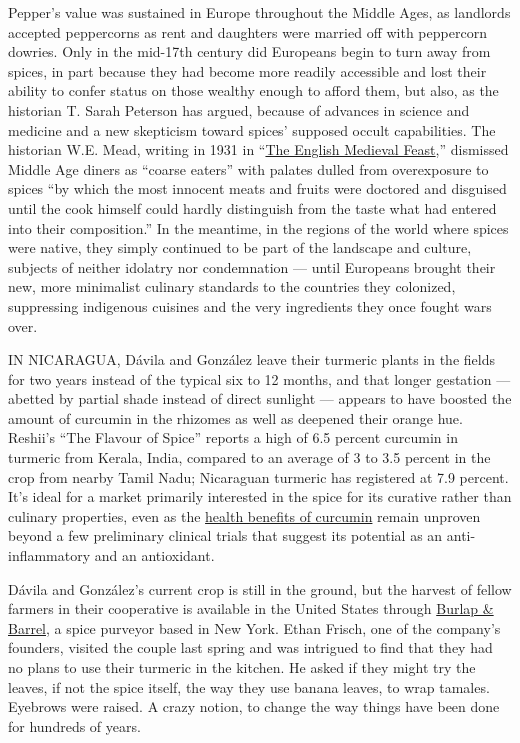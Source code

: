 Pepper's value was sustained in Europe throughout the Middle Ages, as
landlords accepted peppercorns as rent and daughters were married off
with peppercorn dowries. Only in the mid-17th century did Europeans
begin to turn away from spices, in part because they had become more
readily accessible and lost their ability to confer status on those
wealthy enough to afford them, but also, as the historian T. Sarah
Peterson has argued, because of advances in science and medicine and a
new skepticism toward spices' supposed occult capabilities. The
historian W.E. Mead, writing in 1931 in
``\href{https://www.taylorfrancis.com/books/9780429202148}{The English
Medieval Feast},'' dismissed Middle Age diners as ``coarse eaters'' with
palates dulled from overexposure to spices ``by which the most innocent
meats and fruits were doctored and disguised until the cook himself
could hardly distinguish from the taste what had entered into their
composition.'' In the meantime, in the regions of the world where spices
were native, they simply continued to be part of the landscape and
culture, subjects of neither idolatry nor condemnation --- until
Europeans brought their new, more minimalist culinary standards to the
countries they colonized, suppressing indigenous cuisines and the very
ingredients they once fought wars over.

IN NICARAGUA, Dávila and González leave their turmeric plants in the
fields for two years instead of the typical six to 12 months, and that
longer gestation --- abetted by partial shade instead of direct sunlight
--- appears to have boosted the amount of curcumin in the rhizomes as
well as deepened their orange hue. Reshii's ``The Flavour of Spice''
reports a high of 6.5 percent curcumin in turmeric from Kerala, India,
compared to an average of 3 to 3.5 percent in the crop from nearby Tamil
Nadu; Nicaraguan turmeric has registered at 7.9 percent. It's ideal for
a market primarily interested in the spice for its curative rather than
culinary properties, even as the
\href{https://www.nytimes3xbfgragh.onion/2019/10/16/style/self-care/turmeric-benefits.html}{health
benefits of curcumin} remain unproven beyond a few preliminary clinical
trials that suggest its potential as an anti-inflammatory and an
antioxidant.

Dávila and González's current crop is still in the ground, but the
harvest of fellow farmers in their cooperative is available in the
United States through
\href{https://www.nytimes3xbfgragh.onion/2017/07/10/dining/spices-burlap-and-barrel.html?module=inline}{Burlap
\& Barrel}, a spice purveyor based in New York. Ethan Frisch, one of the
company's founders, visited the couple last spring and was intrigued to
find that they had no plans to use their turmeric in the kitchen. He
asked if they might try the leaves, if not the spice itself, the way
they use banana leaves, to wrap tamales. Eyebrows were raised. A crazy
notion, to change the way things have been done for hundreds of years.


